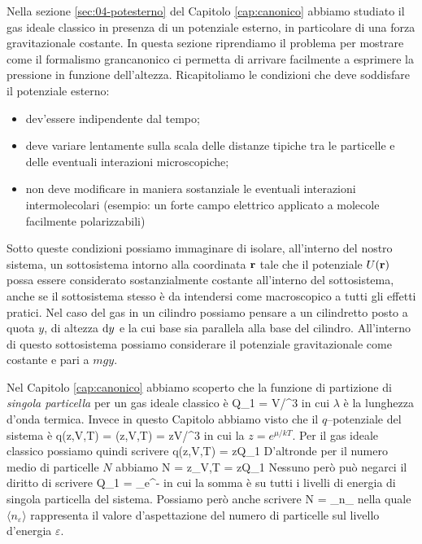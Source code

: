Nella sezione \ref{sec:04-potesterno} del Capitolo \ref{cap:canonico} abbiamo studiato il gas ideale classico in presenza di un potenziale esterno, in particolare di una forza gravitazionale costante. In questa sezione riprendiamo il problema per mostrare come il formalismo grancanonico ci permetta di arrivare facilmente a esprimere la pressione in funzione dell'altezza. Ricapitoliamo le condizioni che deve soddisfare il potenziale esterno:
\begin{itemize}
\item dev'essere indipendente dal tempo;
\item deve variare lentamente sulla scala delle distanze tipiche tra le particelle e delle eventuali interazioni microscopiche;
\item non deve modificare in maniera sostanziale le eventuali interazioni intermolecolari (esempio: un forte campo elettrico applicato a molecole facilmente polarizzabili)
\end{itemize}
Sotto queste condizioni possiamo immaginare di isolare, all'interno del nostro sistema, un sottosistema intorno alla coordinata $\mathbf{r}$ tale che il potenziale $U(\mathbf{r})$ possa essere considerato sostanzialmente costante all'interno del sottosistema, anche se il sottosistema stesso è da intendersi come macroscopico a tutti gli effetti pratici. Nel caso del gas in un cilindro possiamo pensare a un cilindretto posto a quota $y$, di altezza ${\textrm d}y$ e la cui base sia parallela alla base del cilindro. All'interno di questo sottosistema possiamo considerare il potenziale gravitazionale come costante e pari a $mgy$.

Nel Capitolo \ref{cap:canonico} abbiamo scoperto che la funzione di partizione di {\em singola particella} per un gas ideale classico è
\be
Q_1 = V/\lambda^3
\ee
in cui $\lambda$ è la lunghezza d'onda termica. Invece in questo Capitolo abbiamo visto che il $q$--potenziale del sistema è
\be
q(z,V,T) = \ln\calQ(z,V,T) = zV/\lambda^3
\ee
in cui la $z = e^{\mu/kT}$. Per il gas ideale classico possiamo quindi scrivere
\be
q(z,V,T) = zQ_1
\ee 
D'altronde per il numero medio di particelle $N$ abbiamo
\be
\label{eq:05-conGC0}
N = z_{V,T} = zQ_1
\ee
Nessuno però può negarci il diritto di scrivere
\be
\label{eq:05-conGC1}
Q_1 = \sum_\varepsilon e^{-\beta\varepsilon}
\ee
in cui la somma è su tutti i livelli di energia di singola particella del sistema. Possiamo però anche scrivere
\be
\label{eq:05-conGC2}
N = \sum_\varepsilon \langle n_\varepsilon\rangle
\ee
nella quale $\langle n_\varepsilon\rangle$ rappresenta il valore d'aspettazione del numero di particelle sul livello d'energia $\varepsilon$.

